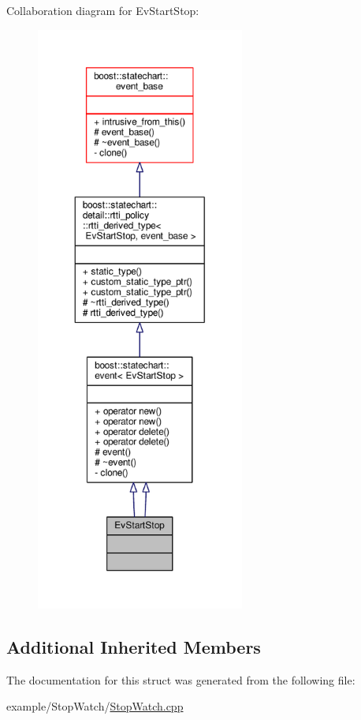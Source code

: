 Collaboration diagram for Ev\+Start\+Stop\+:
\nopagebreak
\begin{figure}[H]
\begin{center}
\leavevmode
\includegraphics[height=550pt]{struct_ev_start_stop__coll__graph}
\end{center}
\end{figure}
\subsection*{Additional Inherited Members}


The documentation for this struct was generated from the following file\+:\begin{DoxyCompactItemize}
\item 
example/\+Stop\+Watch/\mbox{\hyperlink{_stop_watch_8cpp}{Stop\+Watch.\+cpp}}\end{DoxyCompactItemize}
